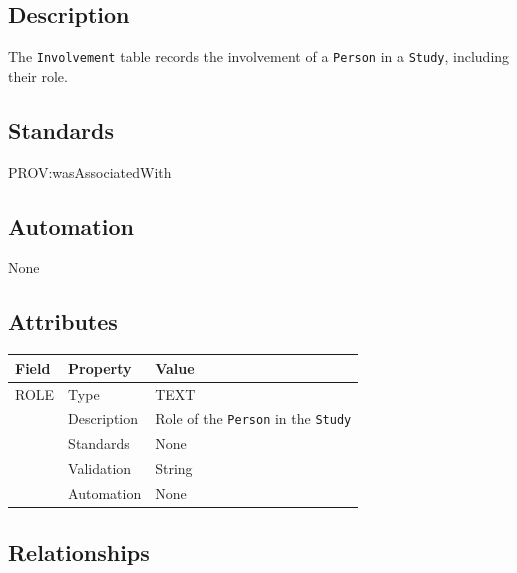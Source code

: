 \documentclass[
]{article}
\newcounter{none} %
\begin{document}
\subsection{Description}\label{description-16}

The \texttt{Involvement} table records the involvement of a
\texttt{Person} in a \texttt{Study}, including their role.

\subsection{Standards}\label{standards-18}

PROV:wasAssociatedWith

\subsection{Automation}\label{automation-18}

None

\subsection{Attributes}\label{attributes-16}

{\def\LTcaptype{none} %
\begin{longtable}[]{@{}lll@{}}
\toprule\noalign{}
Field & Property & Value \\
\midrule\noalign{}
\endhead
\bottomrule\noalign{}
\endlastfoot
ROLE & Type & TEXT \\
& Description & Role of the \texttt{Person} in the \texttt{Study} \\
& Standards & None \\
& Validation & String \\
& Automation & None \\
\end{longtable}
}

\subsection{Relationships}\label{relationships-14}
\end{document}
